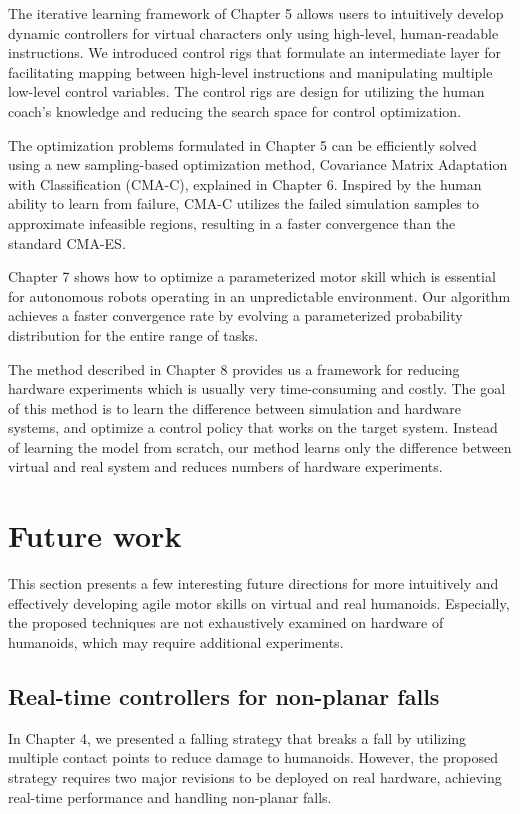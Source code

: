The iterative learning framework of Chapter 5 allows users to intuitively
develop dynamic controllers for virtual characters only using high-level,
human-readable instructions.
We introduced control rigs that
formulate an intermediate layer 
for facilitating mapping between high-level instructions and manipulating
multiple low-level control variables.
The control rigs are design for utilizing the human coach's knowledge and 
reducing the search space for control optimization.

The optimization problems formulated in Chapter 5 can be efficiently solved
using a new sampling-based optimization method, Covariance Matrix
Adaptation with Classification (CMA-C), explained in Chapter 6.
Inspired by the human ability to learn from failure,
CMA-C utilizes the failed simulation samples to approximate infeasible regions,
resulting in a faster convergence than the standard CMA-ES.

Chapter 7 shows how to optimize a parameterized motor skill which
is essential for autonomous robots operating in an unpredictable environment.
Our algorithm achieves a faster convergence rate by evolving a parameterized
probability distribution for the entire range of tasks.

The method described in Chapter 8 provides us a framework for reducing hardware
experiments which is usually very time-consuming and costly.
The goal of this method is to learn the difference between simulation and
hardware systems, and optimize a control policy that works on the target system.
Instead of learning the model from scratch, our method learns only the
difference between virtual and real system and reduces
numbers of hardware experiments.

\section{Future work}
This section presents a few interesting future directions for more intuitively
and effectively developing agile motor skills on virtual and real humanoids.
Especially, the proposed techniques are not exhaustively examined on hardware
of humanoids, which may require additional experiments.

\subsection{Real-time controllers for non-planar falls}
In Chapter 4, we presented a falling strategy that breaks a fall by
utilizing multiple contact points to reduce damage to humanoids.
However, the proposed strategy requires two major revisions to be deployed 
on real hardware, achieving real-time performance and handling non-planar falls.

